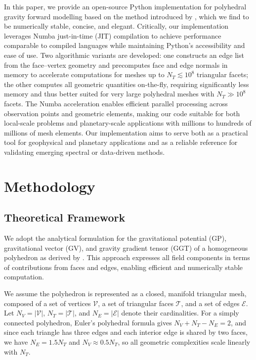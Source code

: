\documentclass{seg}
\begin{document}
In this paper, we provide an open-source Python implementation for polyhedral gravity forward modelling based on the method introduced by \citet{Werner1996CelestialMechDynAstr}, which we find to be numerically stable, concise, and elegant. Critically, our implementation leverages Numba just-in-time (JIT) compilation to achieve performance comparable to compiled languages while maintaining Python's accessibility and ease of use. Two algorithmic variants are developed: one constructs an edge list from the face--vertex geometry and precomputes face and edge normals in memory to accelerate computations for meshes up to $N_T \lesssim 10^8$ triangular facets; the other computes all geometric quantities on-the-fly, requiring significantly less memory and thus better suited for very large polyhedral meshes with $N_T \gg 10^8$ facets. The Numba acceleration enables efficient parallel processing across observation points and geometric elements, making our code suitable for both local-scale problems and planetary-scale applications with millions to hundreds of millions of mesh elements. Our implementation aims to serve both as a practical tool for geophysical and planetary applications and as a reliable reference for validating emerging spectral or data-driven \citep{Martin2022CelestMechDynAstron} methods.


\section{Methodology}

\subsection{Theoretical Framework}

We adopt the analytical formulation for the gravitational potential (GP), gravitational vector (GV), and gravity gradient tensor (GGT) of a homogeneous polyhedron as derived by \citet{Werner1996CelestialMechDynAstr}. This approach expresses all field components in terms of contributions from faces and edges, enabling efficient and numerically stable computation.

We assume the polyhedron is represented as a closed, manifold triangular mesh, composed of a set of vertices $\mathcal{V}$, a set of triangular faces $\mathcal{T}$, and a set of edges $\mathcal{E}$. Let $N_V = |\mathcal{V}|$, $N_T = |\mathcal{T}|$, and $N_E = |\mathcal{E}|$ denote their cardinalities. For a simply connected polyhedron, Euler's polyhedral formula gives $N_V + N_T - N_E = 2$, and since each triangle has three edges and each interior edge is shared by two faces, we have $N_E=1.5 N_T$ and $N_V \approx 0.5 N_T$, so all geometric complexities scale linearly with $N_T$.
\end{document}
